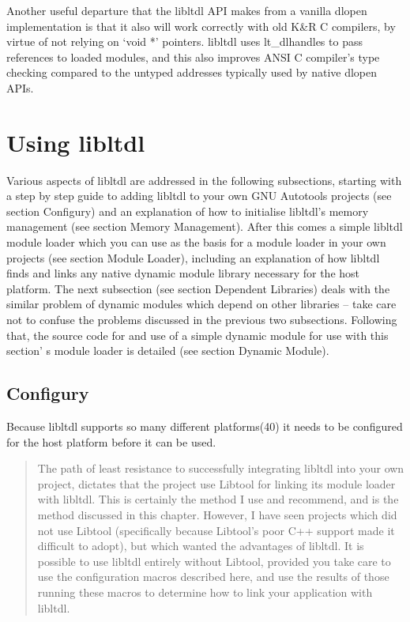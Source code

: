 Another useful departure that the libltdl API makes from a vanilla dlopen 
implementation is that it also will work correctly with old K\&R C 
compilers, by virtue of not relying on `void *' pointers. libltdl uses 
lt\_{}dlhandles to pass references to loaded modules, and this also improves 
ANSI C compiler's type checking compared to the untyped addresses typically 
used by native dlopen APIs.

\section{Using libltdl}

Various aspects of libltdl are addressed in the following subsections,
starting with a step by step guide to adding libltdl to your own GNU 
Autotools projects (see section Configury) and an explanation of how to 
initialise libltdl's memory management (see section Memory Management).
After this comes a simple libltdl module loader which you can use as the 
basis for a module loader in your own projects (see section Module Loader),
including an explanation of how libltdl finds and links any native dynamic 
module library necessary for the host platform. The next subsection
(see section Dependent Libraries) deals with the similar problem of dynamic 
modules which depend on other libraries -- take care not to confuse the 
problems discussed in the previous two subsections. Following that, the source 
code for and use of a simple dynamic module for use with this section'
s module loader is detailed (see section Dynamic Module). 

\subsection{Configury}

Because libltdl supports so many different platforms(40) it needs to be configured for the host platform before it can be used. 

\begin{quote}
The path of least resistance to successfully integrating libltdl into your own project, dictates that the project use Libtool for linking its module loader with libltdl. This is certainly the method I use and recommend, and is the method discussed in this chapter. However, I have seen projects which did not use Libtool (specifically because Libtool's poor C++ support made it difficult to adopt), but which wanted the advantages of libltdl. It is possible to use libltdl entirely without Libtool, provided you take care to use the configuration macros described here, and use the results of those running these macros to determine how to link your application with libltdl.
\end{quote}

